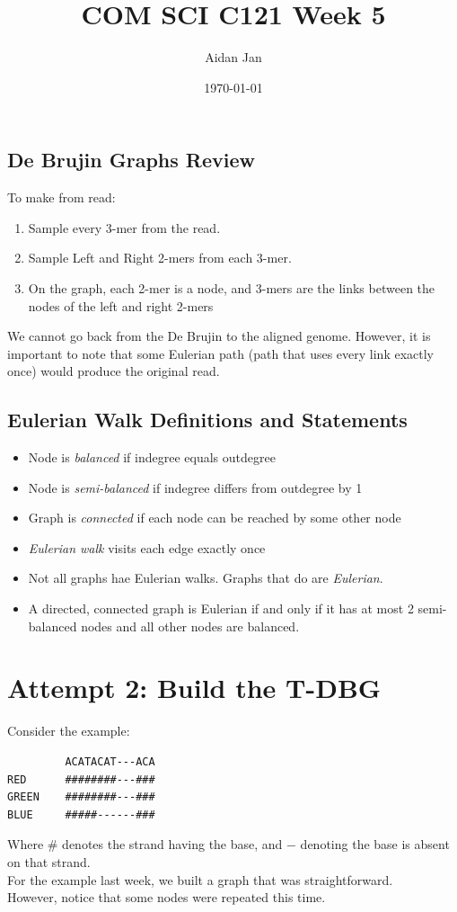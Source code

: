 \documentclass[10pt]{article}
\title{COM SCI C121 Week 5}
\author{Aidan Jan}
\date{\today}
\begin{document}
\maketitle

\subsection*{De Brujin Graphs Review}
To make from read:
\begin{enumerate}
    \item Sample every 3-mer from the read.
    \item Sample Left and Right 2-mers from each 3-mer.
    \item On the graph, each 2-mer is a node, and 3-mers are the links between the nodes of the left and right 2-mers
\end{enumerate}
We cannot go back from the De Brujin to the aligned genome.  However, it is important to note that some Eulerian path (path that uses every link exactly once) would produce the original read.

\subsection*{Eulerian Walk Definitions and Statements}
\begin{itemize}
    \item Node is \textit{balanced} if indegree equals outdegree
    \item Node is \textit{semi-balanced} if indegree differs from outdegree by 1
    \item Graph is \textit{connected} if each node can be reached by some other node
    \item \textit{Eulerian walk} visits each edge exactly once
    \item Not all graphs hae Eulerian walks.  Graphs that do are \textit{Eulerian}.
    \item A directed, connected graph is Eulerian if and only if it has at most 2 semi-balanced nodes and all other nodes are balanced.
\end{itemize}

\section*{Attempt 2: Build the T-DBG}
Consider the example:
\begin{verbatim}
         ACATACAT---ACA
RED      ########---###
GREEN    ########---###
BLUE     #####------###
\end{verbatim}
Where $\#$ denotes the strand having the base, and $-$ denoting the base is absent on that strand.\\
For the example last week, we built a graph that was straightforward.\\
However, notice that some nodes were repeated this time. \\ 
\end{document}
